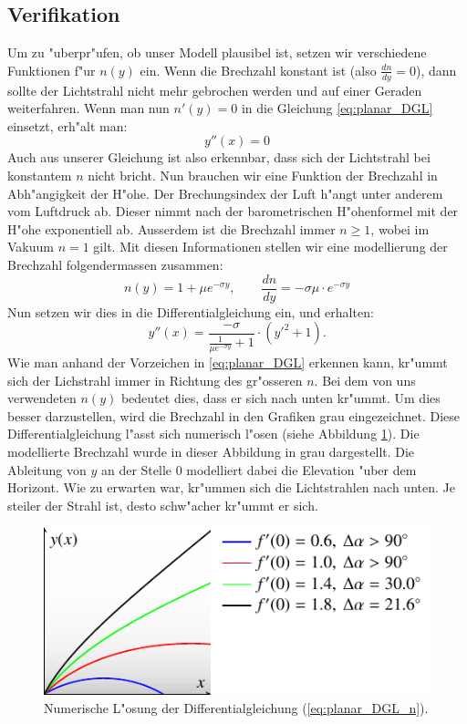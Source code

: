 \begin{refsection}
\subsection{Verifikation}
Um zu "uberpr"ufen, ob unser Modell plausibel ist, setzen wir verschiedene Funktionen f"ur $n(y)$ ein. 
Wenn die Brechzahl konstant ist (also $\frac{dn}{dy} = 0$), dann sollte der Lichtstrahl nicht mehr gebrochen werden und auf einer Geraden weiterfahren. 
Wenn man nun $n'(y)=0$ in die Gleichung \ref{eq:planar_DGL} einsetzt, erh"alt man: 
$$y''(x) = 0$$
Auch aus unserer Gleichung ist also erkennbar, dass sich der Lichtstrahl bei konstantem $n$ nicht bricht.
Nun brauchen wir eine Funktion der Brechzahl in Abh"angigkeit der H"ohe. 
Der Brechungsindex der Luft h"angt unter anderem vom Luftdruck ab. 
Dieser nimmt nach der barometrischen H"ohenformel mit der H"ohe exponentiell ab.
Ausserdem ist die Brechzahl immer $n \geq 1$, wobei im Vakuum $n=1$ gilt. 
Mit diesen Informationen stellen wir eine modellierung der Brechzahl folgendermassen zusammen:
$$n(y) = 1 + \mu e^{- \sigma y}, \qquad \frac{dn}{dy} = -\sigma \mu \cdot e^{-\sigma y}$$
Nun setzen wir dies in die Differentialgleichung ein, und erhalten:
\begin{equation} \label{eq:planar_DGL_n}
y''(x) = \frac{-\sigma}{\displaystyle\frac{1}{\mu e^{-\sigma y}} + 1} \cdot \left( y'^2 + 1 \right).
\end{equation}
Wie man anhand der Vorzeichen in \ref{eq:planar_DGL} erkennen kann, kr"ummt sich der Lichstrahl immer in Richtung des gr"osseren $n$.
Bei dem von uns verwendeten $n(y)$ bedeutet dies, dass er sich nach unten kr"ummt. 
Um dies besser darzustellen, wird die Brechzahl in den Grafiken grau eingezeichnet.
Diese Differentialgleichung l"asst sich numerisch l"osen (siehe Abbildung \ref{fig:planares_modell1}).
Die modellierte Brechzahl wurde in dieser Abbildung in grau dargestellt. 
Die Ableitung von $y$ an der Stelle $0$ modelliert dabei die Elevation "uber dem Horizont.
Wie zu erwarten war, kr"ummen sich die Lichtstrahlen nach unten.
Je steiler der Strahl ist, desto schw"acher kr"ummt er sich. 
\begin{figure}
  \centering
  \includegraphics{licht/standalone/fig_planar_simulation.pdf}
  \caption{Numerische L"osung der Differentialgleichung (\ref{eq:planar_DGL_n}). \label{fig:planares_modell1}}
\end{figure}


\end{refsection}

